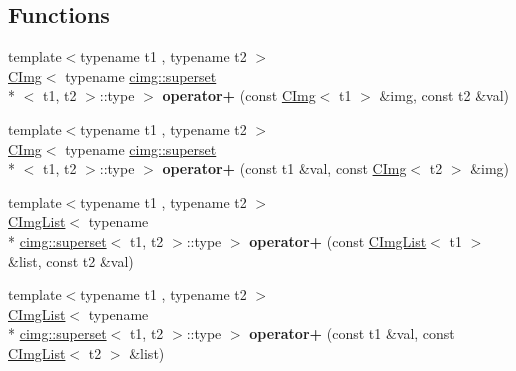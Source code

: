 \subsection*{Functions}
\begin{DoxyCompactItemize}
\item 
\hypertarget{namespacecimg__library_afc607cac6ab154ee1435682c07e22f76}{{\footnotesize template$<$typename t1 , typename t2 $>$ }\\\hyperlink{structcimg__library_1_1_c_img}{C\-Img}$<$ typename \hyperlink{structcimg__library_1_1cimg_1_1superset}{cimg\-::superset}\\*
$<$ t1, t2 $>$\-::type $>$ {\bfseries operator+} (const \hyperlink{structcimg__library_1_1_c_img}{C\-Img}$<$ t1 $>$ \&img, const t2 \&val)}\label{namespacecimg__library_afc607cac6ab154ee1435682c07e22f76}

\item 
\hypertarget{namespacecimg__library_a0fcc463194b25b926864e1773c626a22}{{\footnotesize template$<$typename t1 , typename t2 $>$ }\\\hyperlink{structcimg__library_1_1_c_img}{C\-Img}$<$ typename \hyperlink{structcimg__library_1_1cimg_1_1superset}{cimg\-::superset}\\*
$<$ t1, t2 $>$\-::type $>$ {\bfseries operator+} (const t1 \&val, const \hyperlink{structcimg__library_1_1_c_img}{C\-Img}$<$ t2 $>$ \&img)}\label{namespacecimg__library_a0fcc463194b25b926864e1773c626a22}

\item 
\hypertarget{namespacecimg__library_a0b1c22bac7998acae6d1bc9113f67ed2}{{\footnotesize template$<$typename t1 , typename t2 $>$ }\\\hyperlink{structcimg__library_1_1_c_img_list}{C\-Img\-List}$<$ typename \\*
\hyperlink{structcimg__library_1_1cimg_1_1superset}{cimg\-::superset}$<$ t1, t2 $>$\-::type $>$ {\bfseries operator+} (const \hyperlink{structcimg__library_1_1_c_img_list}{C\-Img\-List}$<$ t1 $>$ \&list, const t2 \&val)}\label{namespacecimg__library_a0b1c22bac7998acae6d1bc9113f67ed2}

\item 
\hypertarget{namespacecimg__library_a7fd53d9cee53b5685de51d36322d3095}{{\footnotesize template$<$typename t1 , typename t2 $>$ }\\\hyperlink{structcimg__library_1_1_c_img_list}{C\-Img\-List}$<$ typename \\*
\hyperlink{structcimg__library_1_1cimg_1_1superset}{cimg\-::superset}$<$ t1, t2 $>$\-::type $>$ {\bfseries operator+} (const t1 \&val, const \hyperlink{structcimg__library_1_1_c_img_list}{C\-Img\-List}$<$ t2 $>$ \&list)}\label{namespacecimg__library_a7fd53d9cee53b5685de51d36322d3095}


\end{DoxyCompactItemize}
